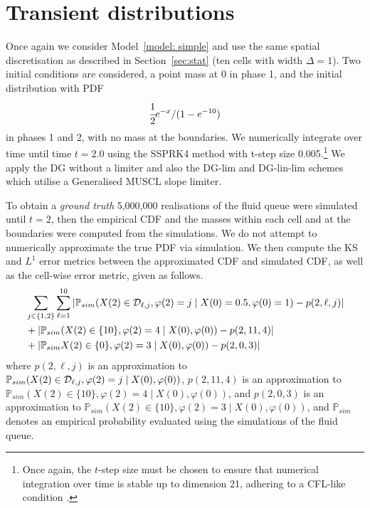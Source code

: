 \section{Transient distributions}\label{sec: transient approx}
Once again we consider Model~\ref{model: simple} and use the same spatial discretisation as described in Section~\ref{sec:stat} (ten cells with width \(\Delta=1\)). Two initial conditions are considered, a point mass at 0 in phase 1, and the initial distribution with PDF 
\begin{align}
	\cfrac{1}{2}e^{-x}/(1-e^{-10})\label{eqn: exp init cond}
\end{align}
in phases 1 and 2, with no mass at the boundaries. We numerically integrate over time until time \(t=2.0\) using the SSPRK4 method with t-step size 0.005.\footnote{Once again, the \(t\)-step size must be chosen to ensure that numerical integration over time is stable up to dimension 21, adhering to a CFL-like condition \cite[Section~4.8]{nodalDGBook}.} We apply the DG without a limiter and also the DG-lim and DG-lin-lim schemes which utilise a Generalised MUSCL slope limiter.

To obtain a \emph{ground truth} 5,000,000 realisations of the fluid queue were simulated until \(t=2\), then the empirical CDF and the masses within each cell and at the boundaries were computed from the simulations. We do not attempt to numerically approximate the true PDF via simulation. We then compute the KS and \(L^1\) error metrics between the approximated CDF and simulated CDF, as well as the cell-wise error metric, given as follows. 
\begin{align}
	&\sum_{j\in\{1,2\}}\sum_{\ell=1}^{10} \left|\mathbb P_{sim}(X(2)\in\mathcal{D}_{\ell,j}, \varphi(2)=j\mid X(0)=0.5,\varphi(0)=1)-p(2,\ell,j)\right|\nonumber 
	\\&+\left|\mathbb P_{sim}(X(2)\in\{10\}, \varphi(2)=4\mid X(0),\varphi(0))-p(2,11,4)\right|\nonumber 
	\\&+\left|\mathbb P_{sim}X(2)\in\{0\}, \varphi(2)=3\mid X(0),\varphi(0))-p(2,0,3)\right| \label{eqn: cell errors 2}
\end{align}
where \(p(2,\ell,j)\) is an approximation to \(\mathbb P_{sim}(X(2)\in\mathcal{D}_{\ell,j}, \varphi(2)=j\mid X(0),\varphi(0))\), \(p(2,11,4)\) is an approximation to \(\mathbb P_{sim}(X(2)\in\{10\}, \varphi(2)=4\mid X(0),\varphi(0))\), and \(p(2,0,3)\) is an approximation to \(\mathbb P_{sim}(X(2)\in\{10\}, \varphi(2)=3\mid X(0),\varphi(0))\), and \(\mathbb P_{sim}\) denotes an empirical probability evaluated using the simulations of the fluid queue. 

